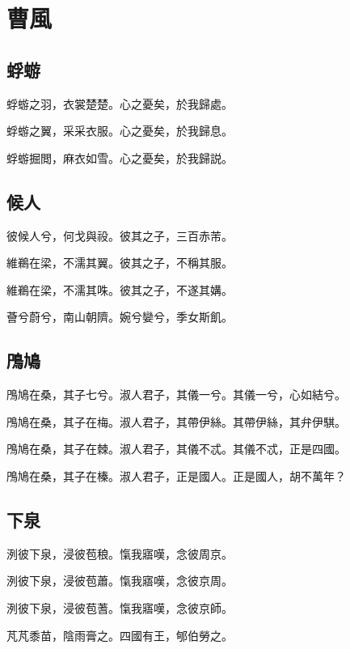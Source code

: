 \section[曹風]{曹風}

\subsection[蜉蝣]{蜉蝣}

蜉蝣之羽，衣裳楚楚。心之憂矣，於我歸處。

蜉蝣之翼，采采衣服。心之憂矣，於我歸息。

蜉蝣掘閲，麻衣如雪。心之憂矣，於我歸説。

\subsection[候人]{候人}

彼候人兮，何戈與祋。彼其之子，三百赤芾。

維鵜在梁，不濡其翼。彼其之子，不稱其服。

維鵜在梁，不濡其咮。彼其之子，不遂其媾。

薈兮蔚兮，南山朝隮。婉兮孌兮，季女斯飢。

\subsection[鳲鳩]{鳲鳩}

鳲鳩在桑，其子七兮。淑人君子，其儀一兮。其儀一兮，心如結兮。

鳲鳩在桑，其子在梅。淑人君子，其帶伊絲。其帶伊絲，其弁伊騏。

鳲鳩在桑，其子在棘。淑人君子，其儀不忒。其儀不忒，正是四國。

鳲鳩在桑，其子在榛。淑人君子，正是國人。正是國人，胡不萬年？

\subsection[下泉]{下泉}

洌彼下泉，浸彼苞稂。愾我寤嘆，念彼周京。

洌彼下泉，浸彼苞蕭。愾我寤嘆，念彼京周。

洌彼下泉，浸彼苞蓍。愾我寤嘆，念彼京師。

芃芃黍苗，陰雨膏之。四國有王，郇伯勞之。
